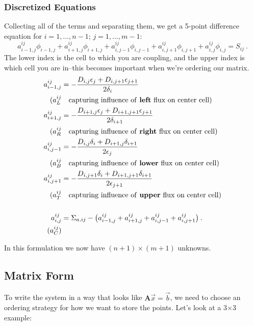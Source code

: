 \documentclass[12pt, answers]{exam}
\newcommand{\ve}[1]{\ensuremath{\mathbf{#1}}}
\begin{document}
\subsubsection*{Discretized Equations}
Collecting all of the terms and separating them, we get a 5-point difference equation for $i=1,\dots,n-1$; $j=1,\dots,m-1$:
%
\[a_{i-1,j}^{ij}\phi_{i-1,j} + a_{i+1,j}^{ij}\phi_{i+1,j} + a_{i,j-1}^{ij}\phi_{i,j-1} + a_{i,j+1}^{ij}\phi_{i,j+1} +  a_{i,j}^{ij}\phi_{i,j} = S_{ij} \:.\]
%
The lower index is the cell to which you are coupling, and the upper index is which cell you are in--this becomes important when we're ordering our matrix.
%
\begin{align}
a_{i-1,j}^{ij} &= -\frac{D_{i,j} \epsilon_{j} + D_{i,j+1} \epsilon_{j+1}}{2 \delta_{i}}  \nonumber \\
(a_L^{ij} & \quad \text{capturing influence of \textbf{left} flux on center cell}) \nonumber \\
%
a_{i+1,j}^{ij} &= -\frac{D_{i+1,j} \epsilon_{j} + D_{i+1,j+1} \epsilon_{j+1}}{2 \delta_{i+1}}  \nonumber \\
(a_R^{ij} & \quad \text{capturing influence of \textbf{right} flux on center cell}) \nonumber \\
%
a_{i,j-1}^{ij} &= -\frac{D_{i,j} \delta_{i} + D_{i+1,j} \delta_{i+1}}{2 \epsilon_{j}}  \nonumber \\
(a_B^{ij} & \quad \text{capturing influence of \textbf{lower} flux on center cell}) \nonumber \\
%
a_{i,j+1}^{ij} &= -\frac{D_{i,j+1} \delta_{i} + D_{i+1,j+1} \delta_{i+1}}{2 \epsilon_{j+1}}  \nonumber \\
(a_T^{ij} & \quad \text{capturing influence of \textbf{upper} flux on center cell}) \nonumber \\
%
\nonumber \\
a_{i,j}^{ij} &= \Sigma_{a,ij} - \bigl(a_{i-1,j}^{ij} + a_{i+1,j}^{ij} + a_{i,j-1}^{ij} + a_{i,j+1}^{ij} \bigr)
 \:.\nonumber \\
 (a_C^{ij}) & \nonumber
\end{align}

In this formulation we now have $(n+1) \times (m+1)$ unknowns. 

\subsection*{Matrix Form}
To write the system in a way that looks like $\ve{A}\vec{x} = \vec{b}$, we need to choose an ordering strategy for how we want to store the points. Let's look at a 3$\times$3 example:
\end{document}
